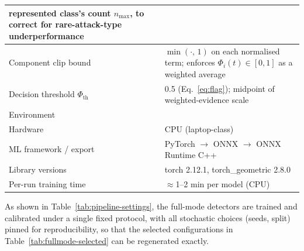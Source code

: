 \documentclass[12pt, a4paper]{report}
\begin{document}
\begin{longtable}{|p{6.0cm}|p{8.0cm}|}
    represented class's count $n_{\max}$, to correct
    for rare-attack-type underperformance \\
\hline
Component clip bound
  & $\min(\cdot,\,1)$ on each normalised term;
    enforces $\Phi_i(t)\in[0,1]$ as a weighted average \\
\hline
Decision threshold $\Phi_{\mathrm{th}}$
  & 0.5 (Eq.~\ref{eq:flag}); midpoint of weighted-evidence scale \\
\hline
\multicolumn{2}{l}{Environment} \\
\hline
Hardware
  & CPU (laptop-class) \\
\hline
ML framework / export
  & PyTorch $\rightarrow$ ONNX $\rightarrow$ ONNX Runtime C++ \\
\hline
Library versions
  & torch 2.12.1, torch\_geometric 2.8.0 \\
\hline
Per-run training time
  & $\approx$1--2 min per model (CPU) \\
\hline
\end{longtable}
\normalsize

As shown in Table~\ref{tab:pipeline-settings}, the full-mode detectors are trained
and calibrated under a single fixed protocol, with all stochastic choices (seeds,
split) pinned for reproducibility, so that the selected configurations in
Table~\ref{tab:fullmode-selected} can be regenerated exactly.
\end{document}
